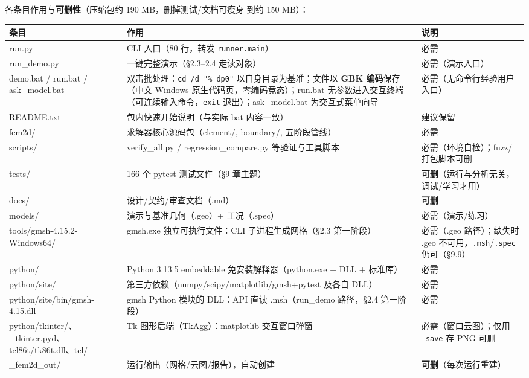 \documentclass[12pt,a4paper]{ctexart}
\newcommand{\fem}{\Verb}
\begin{document}
各条目作用与\textbf{可删性}（压缩包约 190 MB，删掉测试/文档可瘦身
到约 150 MB）：

\begin{longtable}{p{4.6cm}p{5.6cm}p{4.0cm}}
\toprule
\textbf{条目} & \textbf{作用} & \textbf{说明} \\
\midrule
run.py & CLI 入口（80 行，转发 \fem|runner.main|） & 必需 \\
run\_demo.py & 一键完整演示（§2.3--2.4 走读对象） & 必需（演示入口） \\
demo.bat / run.bat / ask\_model.bat & 双击批处理：\texttt{cd /d "\%~dp0"} 以自身目录为基准；文件以 \textbf{GBK 编码}保存（中文 Windows 原生代码页，零编码竞态）；run.bat 无参数进入交互终端（可连续输入命令，\fem|exit| 退出）；ask\_model.bat 为交互式菜单向导 & 必需（无命令行经验用户入口） \\
README.txt & 包内快速开始说明（与实际 bat 内容一致） & 建议保留 \\
fem2d/ & 求解器核心源码包（element/, boundary/, 五阶段管线） & 必需 \\
scripts/ & verify\_all.py / regression\_compare.py 等验证与工具脚本 & 必需（环境自检）；fuzz/打包脚本可删 \\
tests/ & 166 个 pytest 测试文件（§9 章主题） & \textbf{可删}（运行与分析无关，调试/学习才用） \\
docs/ & 设计/契约/审查文档（.md） & \textbf{可删} \\
models/ & 演示与基准几何（.geo）+ 工况（.spec） & 必需（演示/练习） \\
tools/gmsh-4.15.2-Windows64/ & gmsh.exe 独立可执行文件：CLI 子进程生成网格（§2.3 第一阶段） & 必需（.geo 路径）；缺失时 .geo 不可用，\fem|.msh|/\fem|.spec| 仍可（§9.9） \\
python/ & Python 3.13.5 embeddable 免安装解释器（python.exe + DLL + 标准库） & 必需 \\
python/site/ & 第三方依赖（numpy/\allowbreak scipy/\allowbreak matplotlib/\allowbreak gmsh+\allowbreak pytest 及各自 DLL） & 必需 \\
python/site/bin/gmsh-4.15.dll & gmsh Python 模块的 DLL：API 直读 .msh（run\_demo 路径，§2.4 第一阶段） & 必需 \\
python/tkinter/、\_tkinter.pyd、tcl86t/tk86t.dll、tcl/ & Tk 图形后端（TkAgg）：matplotlib 交互窗口弹窗 & 必需（窗口云图）；仅用 \fem|--save| 存 PNG 可删 \\
\_fem2d\_out/ & 运行输出（网格/云图/报告），自动创建 & \textbf{可删}（每次运行重建） \\
\bottomrule
\end{longtable}
\end{document}
